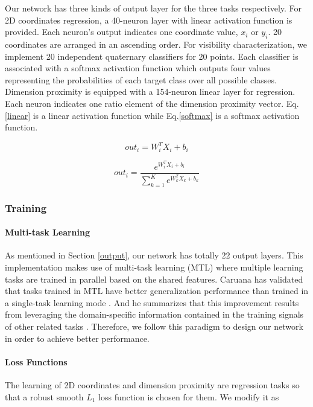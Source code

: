 \documentclass[a4paper,12pt]{article}
\begin{document}
Our network has three kinds of output layer for the three tasks respectively. For 2D coordinates regression, a 40-neuron layer with linear activation function is provided.  Each neuron's output indicates one coordinate value, \ie $x_i$ or $y_i$.  20 coordinates are arranged in an ascending order. For visibility characterization, we implement 20 independent quaternary classifiers for 20 points. Each classifier is associated with a softmax activation function \cite{Bishop:2006:PRM:1162264} which outputs four values representing the probabilities of each target class over all possible classes. Dimension proximity is equipped with a 154-neuron linear layer for regression.  Each neuron indicates one ratio element of the dimension proximity vector. Eq.\ref{linear} is a linear activation function while Eq.\ref{softmax} is a softmax activation function.

\begin{equation}
\label{linear}
out_i = W_i^TX_i+b_i
\end{equation}

\begin{equation}
\label{softmax}
out_i = \frac{e^{W_i^TX_i+b_i}}{\sum_{k=1}^K e^{W_k^TX_k+b_k}}
\end{equation}


\subsubsection{Training}

\paragraph{Multi-task Learning}
As mentioned in Section \ref{output}, our network has totally 22 output layers. This implementation makes use of multi-task learning (MTL) where multiple learning tasks are trained in parallel based on the shared features. Caruana has validated that tasks trained in MTL have better generalization performance than trained in a single-task learning mode \cite{Caruana1997}. And he summarizes that this improvement results from leveraging the domain-specific information contained in the training signals of other related tasks \cite{Caruana1997}. Therefore, we follow this paradigm to design our network in order to achieve better performance.

\paragraph{Loss Functions}
\label{loss_functions}
The learning of 2D coordinates and dimension proximity are regression tasks so that a robust smooth $L_1$ loss function \cite{DBLP:journals/corr/Girshick15} is chosen for them. We modify it as
\end{document}
